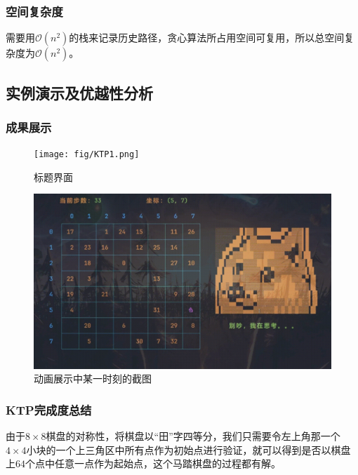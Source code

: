 \vspace{1ex}

\subsubsection{空间复杂度}

需要用$\mathcal{O}(n^2)$的栈来记录历史路径，贪心算法所占用空间可复用，所以总空间复杂度为$\mathcal{O}(n^2)$。


\vspace{1ex}

\subsection{实例演示及优越性分析}

\subsubsection{成果展示}

\begin{figure}[H]
    \centering
    \texttt{[image: fig/KTP1.png]}
    \caption{标题界面}
\end{figure}

\begin{figure}[H]
    \centering
    \includegraphics[width=15cm]{fig/KTP7.png}
    \caption{动画展示中某一时刻的截图}
\end{figure}

\vspace{1ex}

\subsubsection{KTP完成度总结}

由于$8 \times 8$棋盘的对称性，将棋盘以“田”字四等分，我们只需要令左上角那一个$4 \times 4$小块的一个上三角区中所有点作为初始点进行验证，就可以得到是否以棋盘上$64$个点中任意一点作为起始点，这个马踏棋盘的过程都有解。

